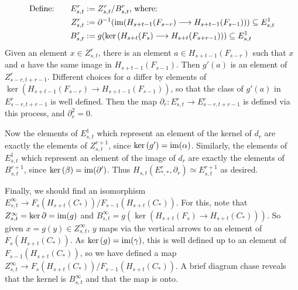 \documentclass[11pt]{article}
\begin{document}
\begin{alignat*}{2}
\text{Define:\qquad } E^r_{s,t}&:=Z^r_{s,t}/B^r_{s,t}\text{, where:}\\
Z^r_{s,t}&:=\partial^{-1}(\operatorname{im}(H_{s+t-1}(F_{s-r})\longrightarrow H_{s+t-1}(F_{s-1})))\subseteq E^1_{s,t}\\
B^r_{s,t}&:=g(\textup{ker}\,(H_{s+t}(F_{s})\longrightarrow H_{s+t}(F_{s+r-1})))\subseteq E^1_{s,t}
\end{alignat*}
Given an element $x\in Z^r_{s,t}$, there is an element $a\in H_{s+t-1}(F_{s-r})$ such that $x$ and $a$ have the same image in $H_{s+t-1}(F_{s-1})$. Then $g'(a)$ is an element of $Z^r_{s-r,t+r-1}$. Different choices for $a$ differ by elements of $\ker(H_{s+t-1}(F_{s-r})\to H_{s+t-1}(F_{s-1}))$, so that the class of $g'(a)$ in $E^r_{s-r,t+r-1}$ is well defined. Then the map $\partial_r:E^r_{s,t}\to E^r_{s-r,t+r-1}$ is defined via this process, and $\partial_r^2=0$.

Now the elements of $E^1_{s,t}$ which represent an element of the kernel of $d_r$ are exactly the elements of $Z^{r+1}_{s,t}$, since $\textup{ker}\,(g')=\operatorname{im}(\alpha)$. Similarly, the elements of $E^1_{s,t}$ which represent an element of the image of $d_r$ are exactly the elements of $B^{r+1}_{s,t}$, since $\textup{ker}\,(\beta)=\operatorname{im}(\partial')$. Thus $H_{s,t}(E^r_{*,*},\partial_r)\simeq E^{r+1}_{s,t}$ as desired.

Finally, we should find an isomorphism $E^\infty_{s,t}\to F_s(H_{s+t}(C_*))/F_{s-1}(H_{s+t}(C_*))$. For this, note that $Z^\infty_{s,t}=\textup{ker}\,\partial=\operatorname{im}(g)$ and $B^\infty_{s,t}=g(\ker(H_{s+t}(F_s)\to H_{s+t}(C_*)))$. So given $x=g(y)\in Z^\infty_{s,t}$, $y$ maps via the vertical arrows to an element of $F_s(H_{s+t}(C_*))$. As $\textup{ker}\,(g)=\operatorname{im}(\gamma)$, this is well defined up to an element of $F_{s-1}(H_{s+t}(C_*))$, so we have defined a map $Z^\infty_{s,t}\to F_s(H_{s+t}(C_*))/F_{s-1}(H_{s+t}(C_*))$. A brief diagram chase reveals that the kernel is $B^\infty_{s,t}$ and that the map is onto.
%

\pagebreak
\end{document}
